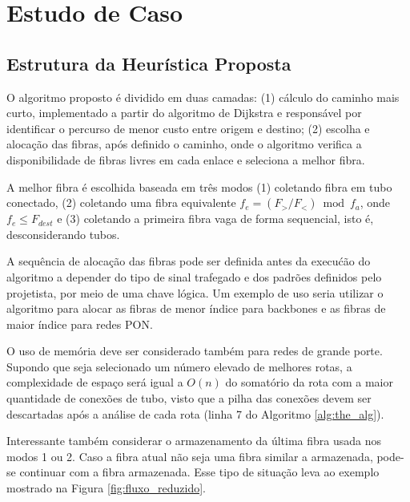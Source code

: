 \section{Estudo de Caso} \label{sec:algorithm}

%
\subsection{Estrutura da Heurística Proposta}

O algoritmo proposto é dividido em duas camadas: (1) cálculo do caminho mais
curto, implementado a partir do algoritmo de Dijkstra e responsável por
identificar o percurso de menor custo entre origem e destino; (2) escolha e
alocação das fibras, após definido o caminho, onde o algoritmo verifica a
disponibilidade de fibras livres em cada enlace e seleciona a melhor fibra.

A melhor fibra é escolhida baseada em três modos (1) coletando fibra em tubo
conectado, (2) coletando uma fibra equivalente $f_e = (F_{>} / {F_{<}}) \bmod
  f_{a}$, onde $f_{e} \leq F_{dest}$ e (3) coletando a primeira
  fibra vaga de forma sequencial, isto é, desconsiderando tubos.

A sequência de alocação das fibras pode ser definida antes da execućão do
algoritmo a depender do tipo de sinal trafegado e dos padrões definidos pelo
projetista, por meio de uma chave lógica. Um exemplo de uso seria utilizar o
algoritmo para alocar as fibras de menor índice para backbones e as fibras de
maior índice para redes PON.

O uso de memória deve ser considerado também para redes de grande porte.
Supondo que seja selecionado um número elevado de melhores rotas, a
complexidade de espaço será igual a $O(n)$ do somatório da rota com a maior
quantidade de conexões de tubo, visto que a pilha das conexões devem ser
descartadas após a análise de cada rota (linha 7 do Algoritmo
\ref{alg:the_alg}).

Interessante também considerar o armazenamento da última fibra usada nos modos
1 ou 2. Caso a fibra atual não seja uma fibra similar a armazenada, pode-se
continuar com a fibra armazenada. Esse tipo de situação leva ao exemplo
mostrado na Figura \ref{fig:fluxo_reduzido}.

